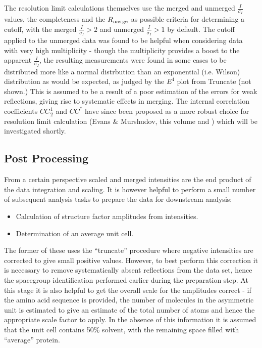 \documentclass[preprint,pdf]{iucr}
\begin{document}
The resolution limit calculations themselves use the merged and
unmerged $\frac{I}{\sigma_I}$ values, the completeness and the
$R_{\rm{merge}}$ as possible criteria for determining a cutoff, with
the merged $\frac{I}{\sigma_I} > 2$ and unmerged 
$\frac{I}{\sigma_I}> 1$ by default. The cutoff applied to the unmerged
data was found to be 
helpful when considering data with very high multiplicity - though the
multiplicity provides a boost to the apparent $\frac{I}{\sigma_I}$,
the resulting measurements were found in some cases
to be distributed more like a
normal distrbution than an exponential (i.e. Wilson) distribution as
would be
expected, as judged by the $E^4$ plot from Truncate (not shown.)
This is assumed
to be a result of a poor estimation of the errors for weak
reflections, giving rise to systematic effects in
merging. The internal correlation coefficients $CC\frac{1}{2}$ and $CC^*$
have since been proposed as a more robust
choice for resolution limit calculation (Evans \& Murshudov, this
volume and \cite{Karplus25052012})
which will be investigated shortly.

\subsection{Post Processing}

From a certain perspective scaled and merged intensities are the end
product of the data integration and scaling. It is however helpful to
perform a small number of subsequent analysis tasks to prepare the
data for downstream analysis:

\begin{itemize}
\item{Calculation of structure factor amplitudes from intensities.}
\item{Determination of an average unit cell.}
\end{itemize}

\noindent
The former of these uses the ``truncate'' procedure \cite{French:a15572}
where negative intensities are corrected to give small positive
values. However, to best perform this correction it is necessary to
remove systematically absent reflections from the data set, hence the
spacegroup identification performed earlier during the preparation
step. At this stage it is also helpful to get the overall scale for
the amplitudes correct - if the amino acid sequence is provided, the
number of molecules in the asymmetric unit is estimated \cite{KantardjieffRupp}
to give an estimate of the total number of atoms
and hence the appropriate scale factor to apply. In the absence of
this information it is assumed that the unit cell contains 50\%
solvent, with the remaining space filled with ``average'' protein. 
\end{document}
